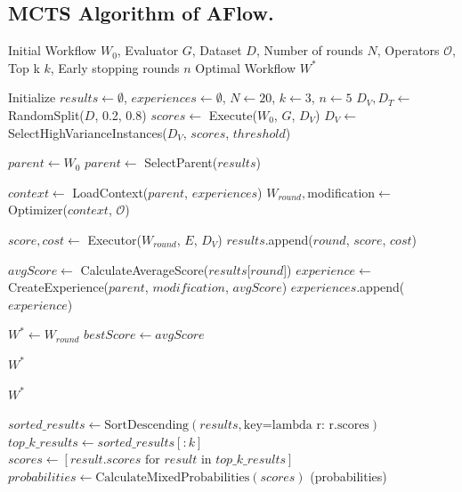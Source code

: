 \documentclass{article} %
\newcommand{\model}{{\sc AFlow}\xspace}
\theoremstyle{plain}
\theoremstyle{definition}
\theoremstyle{remark}
\begin{document}
\subsection{MCTS Algorithm of \model.}
\label{appendix:algorithmaflow}
\vspace{-10mm}
\begin{algorithm}
\caption{Detailed Explanation of the \model Algorithm}
\begin{algorithmic}[1]
\Require Initial Workflow $W_0$, Evaluator $G$, Dataset $D$, Number of rounds $N$, Operators $\mathcal{O}$, Top k $k$, Early stopping rounds $n$
\Ensure Optimal Workflow $W^*$

\State Initialize $results \gets \emptyset$, $experiences \gets \emptyset$, $N \gets 20$, $k \gets 3$, $n \gets 5$
\State $D_V, D_T \gets$ RandomSplit($D$, 0.2, 0.8)  
\State $scores \gets$ Execute($W_0$, $G$, $D_V$)
\State $D_V \gets$ SelectHighVarianceInstances($D_V$, $scores$, $threshold$)  

        \State $parent \gets W_0$
    \Else
        \State $parent \gets$ SelectParent($results$)
    \EndIf
    
    \State $context \gets$ LoadContext($parent$, $experiences$)
    \State $W_{round}, $modification$ \gets$ Optimizer($context$, $\mathcal{O}$)
    
        \State $score, cost \gets$ Executor($W_{round}$, $E$, $D_V$)
        \State $results$.append($round$, $score$, $cost$)
    \EndFor
    
    \State $avgScore \gets$ CalculateAverageScore($results$[$round$])
    \State $experience \gets$ CreateExperience($parent$, $modification$, $avgScore$)
    \State $experiences$.append($experience$)
    
        \State $W^* \gets W_{round}$
        \State $bestScore \gets avgScore$
    \EndIf
      
    
        \Return $W^*$
    \EndIf
\EndFor

\State \Return $W^*$

    \State $sorted\_results \gets \text{SortDescending}(results, \text{key=lambda r: r.scores})$
    \State $top\_k\_results \gets sorted\_results[:k]$
    \State $scores \gets [result.scores \text{ for } result \text{ in } top\_k\_results]$
    \State $probabilities \gets \text{CalculateMixedProbabilities}(scores)$
    \State \Return {}(probabilities)
\EndProcedure


\end{algorithmic}
\end{algorithm}
\end{document}
